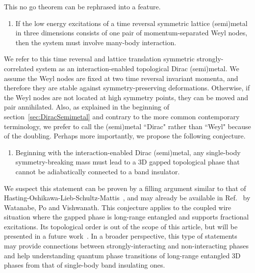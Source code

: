 This no go theorem can be rephrased into a feature. \begin{enumerate}\item If the low energy excitations of a time reversal symmetric lattice (semi)metal in three dimensions consists of one pair of momentum-separated Weyl nodes, then the system must involve many-body interaction.\end{enumerate} We refer to this time reversal and lattice translation symmetric strongly-correlated system as an interaction-enabled topological Dirac (semi)metal. We assume the Weyl nodes are fixed at two time reversal invariant momenta, and therefore they are stable against symmetry-preserving deformations. Otherwise, if the Weyl nodes are not located at high symmetry points, they can be moved and pair annihilated. Also, as explained in the beginning of section~\ref{sec:DiracSemimetal} and contrary to the more common contemporary terminology, we prefer to call the (semi)metal ``Dirac" rather than ``Weyl" because of the doubling. Perhaps more importantly, we propose the following conjecture. \begin{enumerate}\addtocounter{enumi}{1}\item Beginning with the interaction-enabled Dirac (semi)metal, {any} single-body symmetry-breaking mass must lead to a 3D gapped topological phase that cannot be adiabatically connected to a band insulator.\end{enumerate} We suspect this statement can be proven by a filling argument similar to that of Hasting-Oshikawa-Lieb-Schultz-Mattis~\cite{LiebSchultzMattis61,Oshikawa00,Hastings04}, and may already be available in Ref.~ by Watanabe, Po and Vishwanath. This conjecture applies to the coupled wire situation where the gapped phase is long-range entangled and supports fractional excitations. Its topological order is out of the scope of this article, but will be presented in a future work~\cite{SirotaRazaTeoappearsoon}. In a broader perspective, this type of statements may provide connections between strongly-interacting and non-interacting phases and help understanding quantum phase transitions of long-range entangled 3D phases from that of single-body band insulating ones.

